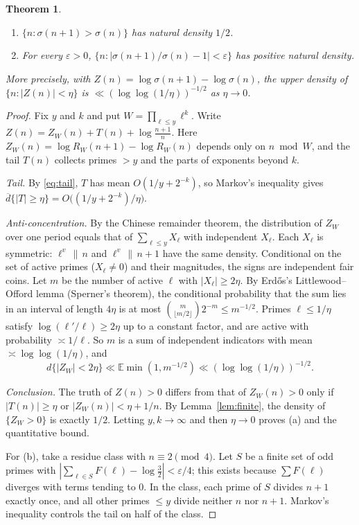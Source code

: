 \documentclass[11pt]{amsart}
\newtheorem{theorem}{Theorem}[section]
\theoremstyle{remark}
\newcommand{\s}{\sigma}
\newcommand{\nx}[1]{#1'}
\begin{document}
\begin{theorem}\label{thm:half}
\begin{enumerate}
\item[(a)] $\{n:\s(n+1)>\s(n)\}$ has natural density $1/2$.
\item[(b)] For every $\varepsilon>0$, $\{n: |\s(n+1)/\s(n)-1|<\varepsilon\}$ has positive natural density.
\end{enumerate}
More precisely, with $Z(n)=\log\s(n+1)-\log\s(n)$, the upper density of $\{n:|Z(n)|<\eta\}$ is $\ll(\log\log(1/\eta))^{-1/2}$ as $\eta\to0$.
\end{theorem}
\begin{proof}
Fix $y$ and $k$ and put $W=\prod_{\ell\le y}\ell^k$. Write $Z(n)=Z_W(n)+T(n)+\log\frac{n+1}{n}$. Here $Z_W(n)=\log R_W(n+1)-\log R_W(n)$ depends only on $n\bmod W$, and the tail $T(n)$ collects primes $>y$ and the parts of exponents beyond $k$.

\emph{Tail.} By \eqref{eq:tail}, $T$ has mean $O(1/y+2^{-k})$, so Markov's inequality gives $\overline{d}\{|T|\ge\eta\}=O\bigl((1/y+2^{-k})/\eta\bigr)$.

\emph{Anti-concentration.} By the Chinese remainder theorem, the distribution of $Z_W$ over one period equals that of $\sum_{\ell\le y}X_\ell$ with independent $X_\ell$. Each $X_\ell$ is symmetric: $\ell^v\,\|\,n$ and $\ell^v\,\|\,n+1$ have the same density. Conditional on the set of active primes ($X_\ell\neq0$) and their magnitudes, the signs are independent fair coins. Let $m$ be the number of active $\ell$ with $|X_\ell|\ge 2\eta$. By Erd\H{o}s's Littlewood--Offord lemma (Sperner's theorem), the conditional probability that the sum lies in an interval of length $4\eta$ is at most $\binom{m}{\lfloor m/2\rfloor}2^{-m}\le m^{-1/2}$. Primes $\ell\le 1/\eta$ satisfy $\log(\nx\ell/\ell)\ge 2\eta$ up to a constant factor, and are active with probability $\asymp 1/\ell$. So $m$ is a sum of independent indicators with mean $\asymp\log\log(1/\eta)$, and
\[
d\{|Z_W|<2\eta\}\ll \mathbb E\min(1,m^{-1/2})\ll(\log\log(1/\eta))^{-1/2}.
\]

\emph{Conclusion.} The truth of $Z(n)>0$ differs from that of $Z_W(n)>0$ only if $|T(n)|\ge\eta$ or $|Z_W(n)|<\eta+1/n$. By Lemma~\ref{lem:finite}, the density of $\{Z_W>0\}$ is exactly $1/2$. Letting $y,k\to\infty$ and then $\eta\to0$ proves (a) and the quantitative bound.

For (b), take a residue class with $n\equiv2\pmod 4$. Let $S$ be a finite set of odd primes with $|\sum_{\ell\in S}F(\ell)-\log\frac32|<\varepsilon/4$; this exists because $\sum F(\ell)$ diverges with terms tending to $0$. In the class, each prime of $S$ divides $n+1$ exactly once, and all other primes $\le y$ divide neither $n$ nor $n+1$. Markov's inequality controls the tail on half of the class.
\end{proof}
\end{document}
